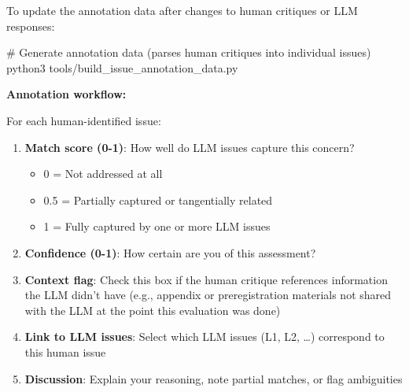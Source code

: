 \documentclass[
  11pt,
  letterpaper,
  DIV=11,
  numbers=noendperiod]{scrreprt}
\newenvironment{Shaded}{\begin{snugshade}}{\end{snugshade}}
\newcommand{\CommentTok}[1]{\textcolor[rgb]{0.37,0.37,0.37}{#1}}
\newcommand{\ExtensionTok}[1]{\textcolor[rgb]{0.00,0.23,0.31}{#1}}
\newcommand{\NormalTok}[1]{\textcolor[rgb]{0.00,0.23,0.31}{#1}}
\providecommand{\tightlist}{%
  \setlength{\itemsep}{0pt}\setlength{\parskip}{0pt}}
\begin{document}
\begin{tcolorbox}[enhanced jigsaw, colback=white, title=\textcolor{quarto-callout-note-color}{\faInfo}\hspace{0.5em}{For developers: Regenerating annotation data}, bottomrule=.15mm, coltitle=black, left=2mm, colframe=quarto-callout-note-color-frame, toptitle=1mm, toprule=.15mm, titlerule=0mm, breakable, leftrule=.75mm, colbacktitle=quarto-callout-note-color!10!white, bottomtitle=1mm, arc=.35mm, rightrule=.15mm, opacityback=0, opacitybacktitle=0.6]

To update the annotation data after changes to human critiques or LLM
responses:

\begin{Shaded}
\begin{Highlighting}[]
\CommentTok{\# Generate annotation data (parses human critiques into individual issues)}
\ExtensionTok{python3}\NormalTok{ tools/build\_issue\_annotation\_data.py}
\end{Highlighting}
\end{Shaded}

\end{tcolorbox}

\textbf{Annotation workflow:}

For each human-identified issue:

\begin{enumerate}
\def\labelenumi{\arabic{enumi}.}
\item
  \textbf{Match score (0-1)}: How well do LLM issues capture this
  concern?

  \begin{itemize}
  \tightlist
  \item
    0 = Not addressed at all
  \item
    0.5 = Partially captured or tangentially related
  \item
    1 = Fully captured by one or more LLM issues
  \end{itemize}
\item
  \textbf{Confidence (0-1)}: How certain are you of this assessment?
\item
  \textbf{Context flag}: Check this box if the human critique references
  information the LLM didn't have (e.g., appendix or preregistration
  materials not shared with the LLM at the point this evaluation was
  done)
\item
  \textbf{Link to LLM issues}: Select which LLM issues (L1, L2, \ldots)
  correspond to this human issue
\item
  \textbf{Discussion}: Explain your reasoning, note partial matches, or
  flag ambiguities
\end{enumerate}
\end{document}
